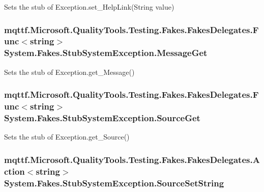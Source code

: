 Sets the stub of Exception.\-set\-\_\-\-Help\-Link(\-String value)

\hypertarget{class_system_1_1_fakes_1_1_stub_system_exception_aca662d262330f0b84d4ed4e9c920c89f}{
\subsubsection[{Message\-Get}]{\setlength{\rightskip}{0pt plus 5cm}mqttf.\-Microsoft.\-Quality\-Tools.\-Testing.\-Fakes.\-Fakes\-Delegates.\-Func$<$string$>$ System.\-Fakes.\-Stub\-System\-Exception.\-Message\-Get}}\label{class_system_1_1_fakes_1_1_stub_system_exception_aca662d262330f0b84d4ed4e9c920c89f}


Sets the stub of Exception.\-get\-\_\-\-Message()

\hypertarget{class_system_1_1_fakes_1_1_stub_system_exception_ad465a108037012ae0e318350a3f1687e}{
\subsubsection[{Source\-Get}]{\setlength{\rightskip}{0pt plus 5cm}mqttf.\-Microsoft.\-Quality\-Tools.\-Testing.\-Fakes.\-Fakes\-Delegates.\-Func$<$string$>$ System.\-Fakes.\-Stub\-System\-Exception.\-Source\-Get}}\label{class_system_1_1_fakes_1_1_stub_system_exception_ad465a108037012ae0e318350a3f1687e}


Sets the stub of Exception.\-get\-\_\-\-Source()

\hypertarget{class_system_1_1_fakes_1_1_stub_system_exception_afa353e64e11ef82a7fa078cb6f3b3b6b}{
\subsubsection[{Source\-Set\-String}]{\setlength{\rightskip}{0pt plus 5cm}mqttf.\-Microsoft.\-Quality\-Tools.\-Testing.\-Fakes.\-Fakes\-Delegates.\-Action$<$string$>$ System.\-Fakes.\-Stub\-System\-Exception.\-Source\-Set\-String}}\label{class_system_1_1_fakes_1_1_stub_system_exception_afa353e64e11ef82a7fa078cb6f3b3b6b}


